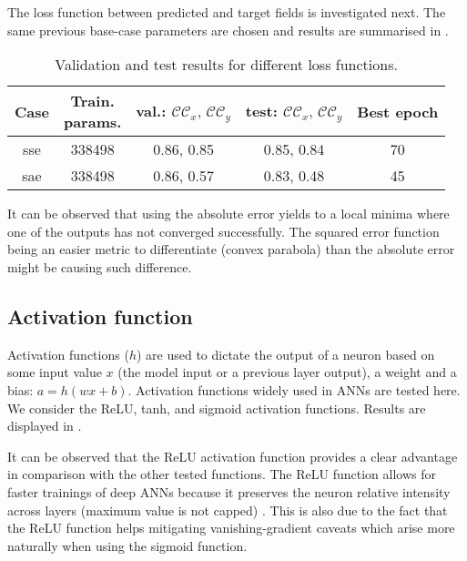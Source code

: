 \documentclass[../main.tex]{subfiles}
\begin{document}
The loss function between predicted and target fields is investigated next.
The same previous base-case parameters are chosen and results are summarised in .

{\renewcommand{\arraystretch}{1.2}
\begin{table}
\begin{center}
\begin{tabular}{ccccc}
\toprule
Case & \specialcell{Train.\\params.} & val.: $\mathcal{CC}_x,\,\mathcal{CC}_y$ & test: $\mathcal{CC}_x,\,\mathcal{CC}_y$ & Best epoch\\
\midrule
sse & 338498 & 0.86, 0.85 & 0.85, 0.84 & 70 \\
sae & 338498 & 0.86, 0.57 & 0.83, 0.48 & 45\\
\bottomrule
\end{tabular}
\end{center}
\caption{Validation and test results for different loss functions.}
\label{tab:loss_correlation}
\end{table}}

It can be observed that using the absolute error yields to a local minima where one of the outputs has not converged successfully.
The squared error function being an easier metric to differentiate (convex parabola) than the absolute error might be causing such difference.

\subsection{Activation function}

Activation functions ($h$) are used to dictate the output of a neuron based on some input value $x$ (the model input or a previous layer output), a weight and a bias: $a = h(wx+b)$.
Activation functions widely used in ANNs are tested here.
We consider the ReLU, tanh, and sigmoid activation functions.
Results are displayed in .

It can be observed that the ReLU activation function provides a clear advantage in comparison with the other tested functions.
The ReLU function allows for faster trainings of deep ANNs because it preserves the neuron relative intensity across layers (maximum value is not capped) \citep{Nair2010}.
This is also due to the fact that the ReLU function helps mitigating vanishing-gradient caveats which arise more naturally when using the sigmoid function.
\end{document}
